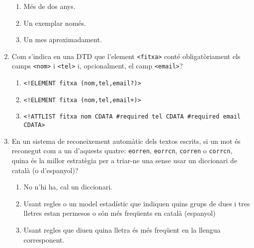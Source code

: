 \begin{enumerate}
\begin{enumerate}
\item Més de dos anys.
\item Un exemplar només.
\item Un mes aproximadament.
\end{enumerate}




\item 
   Com s'indica en una DTD que l'element \verb|<fitxa>| conté
   obligatòriament els camps \verb|<nom>| i
   \verb|<tel>| i, opcionalment, el camp \verb|<email>|?
   
\begin{enumerate}
\item \verb|<!ELEMENT fitxa (nom,tel,email?)>|
\item \verb|<!ELEMENT fitxa (nom,tel,email+)>|
\item \verb|<!ATTLIST fitxa nom CDATA #required tel CDATA #required email CDATA>|
\end{enumerate}

\item En un sistema de reconeixement automàtic dels textos escrits,
  si un mot és reconegut com a un d'aquests quatre:
  \verb|eorren|, \verb|eorrcn|, \verb|corren| o
  \verb|corrcn|, quina és la millor estratègia per a triar-ne
  una sense usar un diccionari de català (o d'espanyol)?
  
\begin{enumerate}
\item No n'hi ha, cal un diccionari.
\item Usant regles o un model estadístic que indiquen quins
  grups de dues i tres lletres estan permesos o són més freqüents en
  català (espanyol)
\item Usant regles que diuen quina lletra és més freqüent en la
  llengua corresponent.
\end{enumerate}


\end{enumerate}

